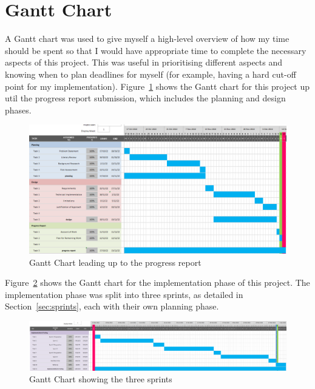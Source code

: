 
\section{Gantt Chart}

A Gantt chart was used to give myself a high-level overview of how my time should be spent so that I would have appropriate time to complete the necessary aspects of this project. This was useful in prioritising different aspects and knowing when to plan deadlines for myself (for example, having a hard cut-off point for my implementation).
\x
Figure~\ref{fig:gantt-chart-1} shows the Gantt chart for this project up util the progress report submission, which includes the planning and design phases.

\begin{figure}[H]
  \centering
  \includegraphics[width=\textwidth]{assets/images/charts/gantt/progress.png}
  \caption{Gantt Chart leading up to the progress report}
  \label{fig:gantt-chart-1}
\end{figure}

\noindent Figure~\ref{fig:gantt-chart-2} shows the Gantt chart for the implementation phase of this project. The implementation phase was split into three sprints, as detailed in Section~\ref{sec:sprints}, each with their own planning phase.

\begin{figure}[H]
  \centering
  \includegraphics[width=\textwidth]{assets/images/charts/gantt/impl.png}
  \caption{Gantt Chart showing the three sprints}
  \label{fig:gantt-chart-2}
\end{figure}

